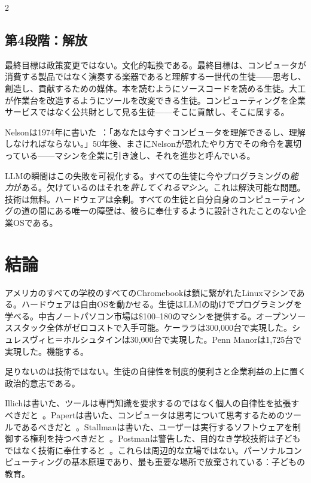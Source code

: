 \documentclass[11pt, a4paper]{article}
\begin{document}
\begin{multicols}{2}
\subsection{第4段階：解放}

最終目標は政策変更ではない。文化的転換である。最終目標は、コンピュータが消費する製品ではなく演奏する楽器であると理解する一世代の生徒——思考し、創造し、貢献するための媒体。本を読むようにソースコードを読める生徒。大工が作業台を改造するようにツールを改変できる生徒。コンピューティングを企業サービスではなく公共財として見る生徒——そこに貢献し、そこに属する。

Nelsonは1974年に書いた~\citep{nelson1974computerlib}：「あなたは今すぐコンピュータを理解できるし、理解しなければならない。」50年後、まさにNelsonが恐れたやり方でその命令を裏切っている——マシンを企業に引き渡し、それを進歩と呼んでいる。

LLMの瞬間はこの失敗を可視化する。すべての生徒に今やプログラミングの\emph{能力}がある。欠けているのはそれを\emph{許してくれるマシン}。これは解決可能な問題。技術は無料。ハードウェアは余剰。すべての生徒と自分自身のコンピューティングの道の間にある唯一の障壁は、彼らに奉仕するように設計されたことのない企業OSである。


\section{結論}

アメリカのすべての学校のすべてのChromebookは鎖に繋がれたLinuxマシンである。ハードウェアは自由OSを動かせる。生徒はLLMの助けでプログラミングを学べる。中古ノートパソコン市場は\$100--180のマシンを提供する。オープンソーススタック全体がゼロコストで入手可能。ケーララは300,000台で実現した。シュレスヴィヒ＝ホルシュタインは30,000台で実現した。Penn Manorは1,725台で実現した。機能する。

足りないのは技術ではない。生徒の自律性を制度的便利さと企業利益の上に置く政治的意志である。

Illichは書いた、ツールは専門知識を要求するのではなく個人の自律性を拡張すべきだと~\citep{illich1973tools}。Papertは書いた、コンピュータは思考について思考するためのツールであるべきだと~\citep{papert1980mindstorms}。Stallmanは書いた、ユーザーは実行するソフトウェアを制御する権利を持つべきだと~\citep{stallman2002free}。Postmanは警告した、目的なき学校技術は子どもではなく技術に奉仕すると~\citep{postman1995end}。これらは周辺的な立場ではない。パーソナルコンピューティングの基本原理であり、最も重要な場所で放棄されている：子どもの教育。


\end{multicols}
\end{document}
